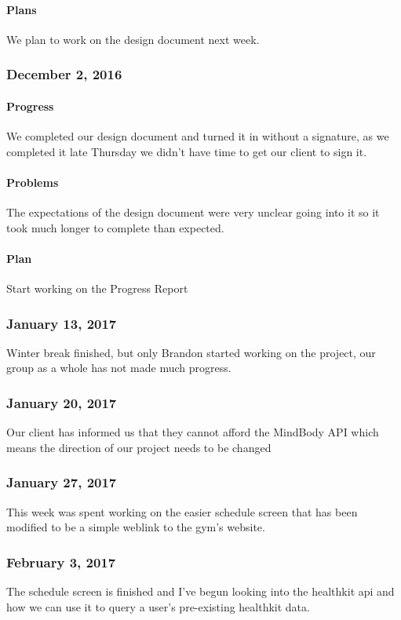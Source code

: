 \paragraph{Plans}\label{plans}
We plan to work on the design document next week.

\subsubsection{December 2, 2016}\label{section}
\paragraph{Progress}\label{progress}
We completed our design document and turned it in without a signature,
as we completed it late Thursday we didn't have time to get our client
to sign it.
\paragraph{Problems}\label{problems}
The expectations of the design document were very unclear going into it
so it took much longer to complete than expected.
\paragraph{Plan}\label{plan}
Start working on the Progress Report

\subsubsection{January 13, 2017}\label{section}
Winter break finished, but only Brandon started working on the project, our group as a whole has not made much progress.

\subsubsection{January 20, 2017}\label{section}
Our client has informed us that they cannot afford the MindBody API which means the direction of our project needs to be changed

\subsubsection{January 27, 2017}\label{section}
This week was spent working on the easier schedule screen that has been modified to be a simple weblink to the gym's website.

\subsubsection{February 3, 2017}\label{section}
The schedule screen is finished and I've begun looking into the healthkit api and how we can use it to query a user's pre-existing healthkit data.


